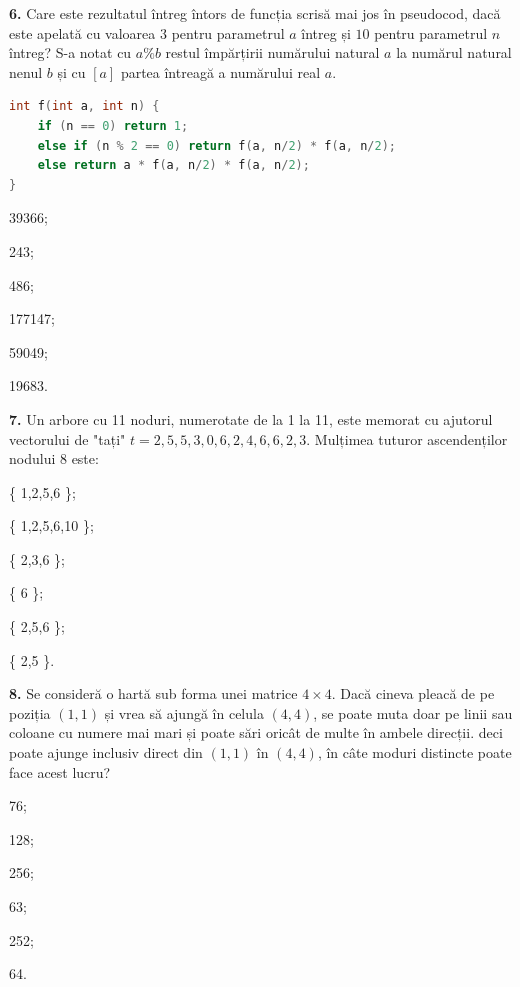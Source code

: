 \documentclass[11pt, a4paper]{article}
\begin{document}
\vspace{0.5cm}

\textbf{6.}\newline
Care este rezultatul întreg întors de funcția scrisă mai jos în pseudocod, dacă este apelată cu valoarea $3$ pentru parametrul $a$ întreg și $10$ pentru parametrul $n$ întreg? S-a notat cu $a\%b$ restul împărțirii numărului natural $a$ la numărul natural nenul $b$ și cu $[a]$ partea întreagă a numărului real $a$.
\begin{lstlisting}[language=C++]
int f(int a, int n) {
    if (n == 0) return 1;
    else if (n % 2 == 0) return f(a, n/2) * f(a, n/2);
    else return a * f(a, n/2) * f(a, n/2);
}
\end{lstlisting}
\begin{inparaenum}
    \item 39366;
    \item 243;
    \item 486;
    \item 177147;
    \item 59049;
    \item 19683.
\end{inparaenum}

\vspace{0.5cm}

\textbf{7.}\newline
Un arbore cu 11 noduri, numerotate de la 1 la 11, este memorat cu ajutorul vectorului  de "tați" $t={2,5,5,3,0,6,2,4,6,6,2,3}$. Mulțimea tuturor ascendenților nodului 8 este:
\begin{inparaenum}
    \item \{ 1,2,5,6 \};
    \item \{ 1,2,5,6,10 \};
    \item \{ 2,3,6 \};
    \item \{ 6 \};
    \item \{ 2,5,6 \};
    \item \{ 2,5 \}.
\end{inparaenum} 

\vspace{0.5cm}

\textbf{8.}\newline
Se consideră o hartă sub forma unei matrice $4\times4$. Dacă cineva pleacă de pe poziția $(1,1)$ și vrea să ajungă în celula $(4,4)$, se poate muta doar pe linii sau coloane cu numere mai mari și poate sări oricât de multe în ambele direcții. deci poate ajunge inclusiv direct din $(1,1)$ în $(4,4)$, în câte moduri distincte poate face acest lucru?
\begin{inparaenum}
    \item 76;
    \item 128;
    \item 256;
    \item 63;
    \item 252;
    \item 64.
\end{inparaenum}
\vspace{0.5cm}
\end{document}
